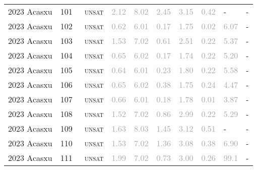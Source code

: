 \begin{center}
{\begin{longtable}{@{}llllllllll@{}}
2023 Acasxu & 101 & ~\textsc{unsat} & \textcolor{darkgray}{2.12} & \textcolor{darkgray}{8.02} & \textcolor{darkgray}{2.45} & \textcolor{darkgray}{3.15} & \textcolor{darkgray}{0.42} & - & - \\
2023 Acasxu & 102 & ~\textsc{unsat} & \textcolor{darkgray}{0.62} & \textcolor{darkgray}{6.01} & \textcolor{darkgray}{0.17} & \textcolor{darkgray}{1.75} & \textcolor{darkgray}{0.02} & \textcolor{darkgray}{6.07} & - \\
2023 Acasxu & 103 & ~\textsc{unsat} & \textcolor{darkgray}{1.53} & \textcolor{darkgray}{7.02} & \textcolor{darkgray}{0.61} & \textcolor{darkgray}{2.51} & \textcolor{darkgray}{0.22} & \textcolor{darkgray}{5.37} & - \\
2023 Acasxu & 104 & ~\textsc{unsat} & \textcolor{darkgray}{0.65} & \textcolor{darkgray}{6.02} & \textcolor{darkgray}{0.17} & \textcolor{darkgray}{1.74} & \textcolor{darkgray}{0.22} & \textcolor{darkgray}{5.20} & - \\
2023 Acasxu & 105 & ~\textsc{unsat} & \textcolor{darkgray}{0.64} & \textcolor{darkgray}{6.01} & \textcolor{darkgray}{0.23} & \textcolor{darkgray}{1.80} & \textcolor{darkgray}{0.22} & \textcolor{darkgray}{5.58} & - \\
2023 Acasxu & 106 & ~\textsc{unsat} & \textcolor{darkgray}{0.65} & \textcolor{darkgray}{6.02} & \textcolor{darkgray}{0.38} & \textcolor{darkgray}{1.75} & \textcolor{darkgray}{0.24} & \textcolor{darkgray}{4.47} & - \\
2023 Acasxu & 107 & ~\textsc{unsat} & \textcolor{darkgray}{0.66} & \textcolor{darkgray}{6.01} & \textcolor{darkgray}{0.18} & \textcolor{darkgray}{1.78} & \textcolor{darkgray}{0.01} & \textcolor{darkgray}{3.87} & - \\
2023 Acasxu & 108 & ~\textsc{unsat} & \textcolor{darkgray}{1.52} & \textcolor{darkgray}{7.02} & \textcolor{darkgray}{0.86} & \textcolor{darkgray}{2.99} & \textcolor{darkgray}{0.22} & \textcolor{darkgray}{5.29} & - \\
2023 Acasxu & 109 & ~\textsc{unsat} & \textcolor{darkgray}{1.63} & \textcolor{darkgray}{8.03} & \textcolor{darkgray}{1.45} & \textcolor{darkgray}{3.12} & \textcolor{darkgray}{0.51} & - & - \\
2023 Acasxu & 110 & ~\textsc{unsat} & \textcolor{darkgray}{1.53} & \textcolor{darkgray}{7.02} & \textcolor{darkgray}{1.36} & \textcolor{darkgray}{3.08} & \textcolor{darkgray}{0.38} & \textcolor{darkgray}{6.90} & - \\
2023 Acasxu & 111 & ~\textsc{unsat} & \textcolor{darkgray}{1.99} & \textcolor{darkgray}{7.02} & \textcolor{darkgray}{0.73} & \textcolor{darkgray}{3.00} & \textcolor{darkgray}{0.26} & \textcolor{darkgray}{99.1} & - \\

\end{longtable}}
\end{center}
